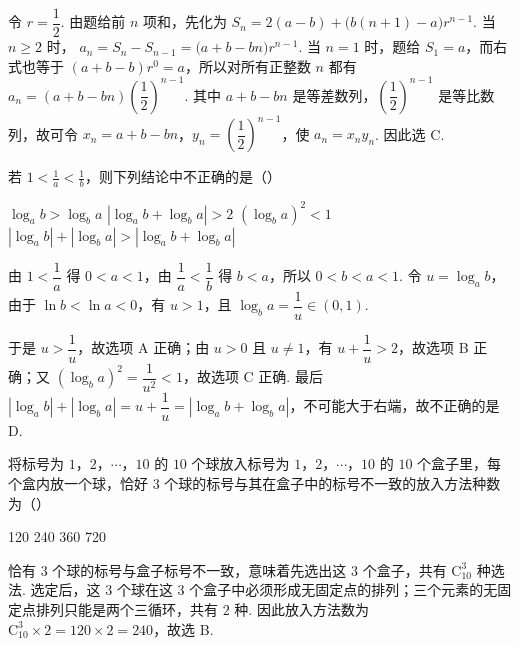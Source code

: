 \begin{solution}
令 \(r=\dfrac{1}{2}\). 由题给前 \(n\) 项和，先化为
\(S_n=2(a-b)+\bigl(b(n+1)-a\bigr)r^{n-1}\).
当 \(n\geqslant2\) 时，
\(a_n=S_n-S_{n-1}=\bigl(a+b-bn\bigr)r^{n-1}\).
当 \(n=1\) 时，题给 \(S_1=a\)，而右式也等于 \(\left(a+b-b\right)r^0=a\)，所以对所有正整数 \(n\) 都有
\(a_n=(a+b-bn)\left(\dfrac12\right)^{n-1}\).
其中 \(a+b-bn\) 是等差数列，\(\left(\dfrac12\right)^{n-1}\) 是等比数列，故可令
\(x_n=a+b-bn\)，\(y_n=\left(\dfrac12\right)^{n-1}\)，使 \(a_n=x_ny_n\). 因此选 C.
\end{solution}

\begin{problem}
若 \(1<\frac{1}{a}<\frac{1}{b}\)，则下列结论中不正确的是（\quad）

\choices
    {\(\log_a b>\log_b a\)}
    {\(\left|\log_a b+\log_b a\right|>2\)}
    {\(\left(\log_b a\right)^2<1\)}
    {\(\left|\log_a b\right|+\left|\log_b a\right|>\left|\log_a b+\log_b a\right|\)}
\end{problem}

\begin{solution}
由 \(1<\dfrac1a\) 得 \(0<a<1\)，由 \(\dfrac1a<\dfrac1b\) 得 \(b<a\)，所以 \(0<b<a<1\). 令 \(u=\log_a b\)，由于 \(\ln b<\ln a<0\)，有 \(u>1\)，且
\(\log_b a=\dfrac1u\in(0,1)\).

于是 \(u>\dfrac1u\)，故选项 A 正确；由 \(u>0\) 且 \(u\neq1\)，有 \(u+\dfrac1u>2\)，故选项 B 正确；又 \(\left(\log_b a\right)^2=\dfrac1{u^2}<1\)，故选项 C 正确. 最后
\(\left|\log_a b\right|+\left|\log_b a\right|=u+\dfrac1u=\left|\log_a b+\log_b a\right|\)，不可能大于右端，故不正确的是 D.
\end{solution}

\begin{problem}
将标号为 \(1\)，\(2\)，\(\cdots\)，\(10\) 的 \(10\) 个球放入标号为 \(1\)，\(2\)，\(\cdots\)，\(10\) 的 \(10\) 个盒子里，每个盒内放一个球，恰好 \(3\) 个球的标号与其在盒子中的标号不一致的放入方法种数为（\quad）

\choices
    {120}
    {240}
    {360}
    {720}
\end{problem}

\begin{solution}
恰有 \(3\) 个球的标号与盒子标号不一致，意味着先选出这 \(3\) 个盒子，共有 \(\mathrm C_{10}^3\) 种选法. 选定后，这 \(3\) 个球在这 \(3\) 个盒子中必须形成无固定点的排列；三个元素的无固定点排列只能是两个三循环，共有 \(2\) 种.
因此放入方法数为
\(\mathrm C_{10}^3\times2=120\times2=240\)，故选 B.
\end{solution}

